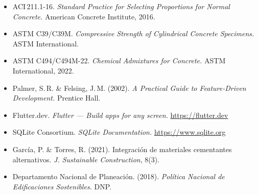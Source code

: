 \documentclass[10pt]{article}
\begin{document}
\begin{minipage}[t]{0.2425\textwidth}
  \begin{tcolorbox}[posterbox, title=Referencias Bibliogr\'{a}ficas]
    \scriptsize
    \begin{itemize}[leftmargin=10pt, topsep=0pt, itemsep=1pt]
      \item ACI\,211.1-16. \textit{Standard Practice for Selecting Proportions
            for Normal Concrete.} American Concrete Institute, 2016.
      \item ASTM C39/C39M. \textit{Compressive Strength of Cylindrical Concrete
            Specimens.} ASTM International.
      \item ASTM C494/C494M-22. \textit{Chemical Admixtures for Concrete.}
            ASTM International, 2022.
      \item Palmer, S.\,R. \& Felsing, J.\,M. (2002). \textit{A Practical Guide
            to Feature-Driven Development.} Prentice Hall.
      \item Flutter.dev. \textit{Flutter — Build apps for any screen.}
            \url{https://flutter.dev}
      \item SQLite Consortium. \textit{SQLite Documentation.}
            \url{https://www.sqlite.org}
      \item García, P. \& Torres, R. (2021). Integración de materiales
            cementantes alternativos. \textit{J. Sustainable Construction}, 8(3).
      \item Departamento Nacional de Planeación. (2018).
            \textit{Política Nacional de Edificaciones Sostenibles.} DNP.
    \end{itemize}
  \end{tcolorbox}

\end{minipage}
\end{document}
